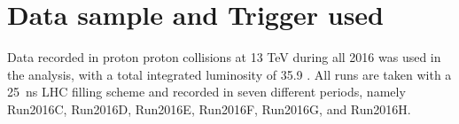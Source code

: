 \section{Data sample and Trigger used}

Data recorded in proton proton collisions at 13 TeV during all 2016 was used in the analysis, with a total integrated luminosity of  35.9 \fbinv.
All runs are taken with a 25~ns LHC filling scheme and recorded in seven different periods, namely Run2016C, Run2016D, Run2016E, Run2016F, Run2016G, and Run2016H.
